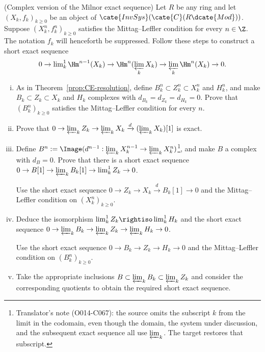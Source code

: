 \begin{Exercises}
	\item (Complex version of the Milnor exact sequence) Let $R$ be any ring
	and let $(X_k,f_k)_{k\geq0}$ be an object of
	$\cate{InvSys}(\cate{C}(R\dcate{Mod}))$. Suppose
	$(X_k^n,f_k^n)_{k\geq0}$ satisfies the Mittag--Leffler condition for every
	$n\in\Z$. The notation $f_k$ will henceforth be suppressed. Follow these
	steps to construct a short exact sequence
	\[
		0\to\lim\nolimits^1_k\Hm^{n-1}(X_k)
		\to\Hm^n(\varprojlim_kX_k)
		\to\varprojlim_k\Hm^n(X_k)\to0.
	\]
	\begin{enumerate}[(i)]
		\item As in Theorem~\ref{prop:CE-resolution}, define
		$B_k^n\subset Z_k^n\subset X_k^n$ and $H_k^n$, and make
		$B_k\subset Z_k\subset X_k$ and $H_k$ complexes with
		$d_{B_k}=d_{Z_k}=d_{H_k}=0$. Prove that
		$(B_k^n)_{k\geq0}$ satisfies the Mittag--Leffler condition for every
		$n$.
		\item Prove that
		$0\to\varprojlim_kZ_k\to\varprojlim_kX_k
		\xrightarrow{d}(\varprojlim_kX_k)[1]$ is exact.
		\item Define
		$B^n:=\Image(d^{n-1}:\varprojlim_kX_k^{n-1}\to
		\varprojlim_kX_k^n)$\footnote{Translator's note (O014-C067): the
		source omits the subscript $k$ from the limit in the codomain, even
		though the domain, the system under discussion, and the subsequent
		exact sequence all use $\varprojlim_k$. The target restores that
		subscript.}, and make $B$ a complex with $d_B=0$. Prove that there is a
		short exact sequence
		$0\to B[1]\to\varprojlim_kB_k[1]\to\lim\nolimits^1_kZ_k\to0$.
		\begin{hint}
			Use the short exact sequence
			$0\to Z_k\to X_k\xrightarrow{d}B_k[1]\to0$ and the
			Mittag--Leffler condition on $(X_k^n)_{k\geq0}$.
		\end{hint}
		\item Deduce the isomorphism
		$\lim\nolimits^1_kZ_k\rightiso\lim\nolimits^1_kH_k$ and the short
		exact sequence
		$0\to\varprojlim_kB_k\to\varprojlim_kZ_k
		\to\varprojlim_kH_k\to0$.
		\begin{hint}
			Use the short exact sequence
			$0\to B_k\to Z_k\to H_k\to0$ and the Mittag--Leffler condition on
			$(B_k^n)_{k\geq0}$.
		\end{hint}
		\item Take the appropriate inclusions
		$B\subset\varprojlim_kB_k\subset\varprojlim_kZ_k$ and consider the
		corresponding quotients to obtain the required short exact sequence.
	\end{enumerate}


\end{Exercises}

